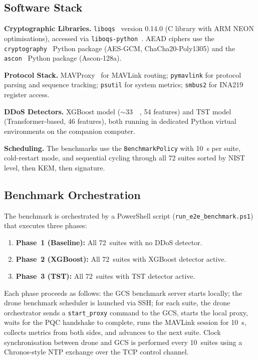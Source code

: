 \documentclass[conference]{IEEEtran}
\begin{document}
\subsection{Software Stack}

\textbf{Cryptographic Libraries.}
\texttt{liboqs}~\cite{liboqs} version 0.14.0 (C library with ARM NEON optimisations), accessed via \texttt{liboqs-python}~\cite{oqspython}.
AEAD ciphers use the \texttt{cryptography}~\cite{cryptography-lib} Python package (AES-GCM, ChaCha20-Poly1305) and the \texttt{ascon}~\cite{ascon} Python package (Ascon-128a).

\textbf{Protocol Stack.}
MAVProxy~\cite{mavproxy} for MAVLink routing; \texttt{pymavlink} for protocol parsing and sequence tracking; \texttt{psutil} for system metrics; \texttt{smbus2} for INA219 register access.

\textbf{DDoS Detectors.}
XGBoost model ($\sim$\SI{33}{\mega\byte}, 54 features) and TST model (Transformer-based, 46 features), both running in dedicated Python virtual environments on the companion computer.

\textbf{Scheduling.}
The benchmarks use the \texttt{BenchmarkPolicy} with \SI{10}{\second} per suite, cold-restart mode, and sequential cycling through all 72 suites sorted by NIST level, then KEM, then signature.

\subsection{Benchmark Orchestration}

The benchmark is orchestrated by a PowerShell script (\texttt{run\_e2e\_benchmark.ps1}) that executes three phases:

\begin{enumerate}[noitemsep]
    \item \textbf{Phase~1 (Baseline):} All 72~suites with no DDoS detector.
    \item \textbf{Phase~2 (XGBoost):} All 72~suites with XGBoost detector active.
    \item \textbf{Phase~3 (TST):} All 72~suites with TST detector active.
\end{enumerate}

Each phase proceeds as follows: the GCS benchmark server starts locally; the drone benchmark scheduler is launched via SSH; for each suite, the drone orchestrator sends a \texttt{start\_proxy} command to the GCS, starts the local proxy, waits for the PQC handshake to complete, runs the MAVLink session for \SI{10}{\second}, collects metrics from both sides, and advances to the next suite.
Clock synchronisation between drone and GCS is performed every 10~suites using a Chronos-style NTP exchange over the TCP control channel.
\end{document}
